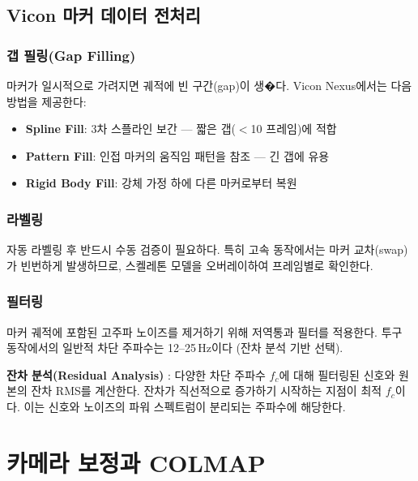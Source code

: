 \documentclass[11pt, a4paper]{report}
\begin{document}
\section{Vicon 마커 데이터 전처리}

\subsection{갭 필링(Gap Filling)}

마커가 일시적으로 가려지면 궤적에 빈 구간(gap)이 생�다. Vicon Nexus에서는 다음 방법을 제공한다:

\begin{itemize}[nosep]
  \item \textbf{Spline Fill}: 3차 스플라인 보간 --- 짧은 갭($<$10 프레임)에 적합
  \item \textbf{Pattern Fill}: 인접 마커의 움직임 패턴을 참조 --- 긴 갭에 유용
  \item \textbf{Rigid Body Fill}: 강체 가정 하에 다른 마커로부터 복원
\end{itemize}

\subsection{라벨링}

자동 라벨링 후 반드시 수동 검증이 필요하다. 특히 고속 동작에서는 마커 교차(swap)가 빈번하게 발생하므로,
스켈레톤 모델을 오버레이하여 프레임별로 확인한다.

\subsection{필터링}

마커 궤적에 포함된 고주파 노이즈를 제거하기 위해 저역통과 필터를 적용한다.
투구 동작에서의 일반적 차단 주파수는 12--25\,Hz이다 (잔차 분석 기반 선택).

\begin{biomechbox}
\textbf{잔차 분석(Residual Analysis)} \cite{winter2009}: 다양한 차단 주파수 $f_c$에 대해
필터링된 신호와 원본의 잔차 RMS를 계산한다. 잔차가 직선적으로 증가하기 시작하는 지점이
최적 $f_c$이다. 이는 신호와 노이즈의 파워 스펙트럼이 분리되는 주파수에 해당한다.
\end{biomechbox}


\chapter{카메라 보정과 COLMAP}
\end{document}
